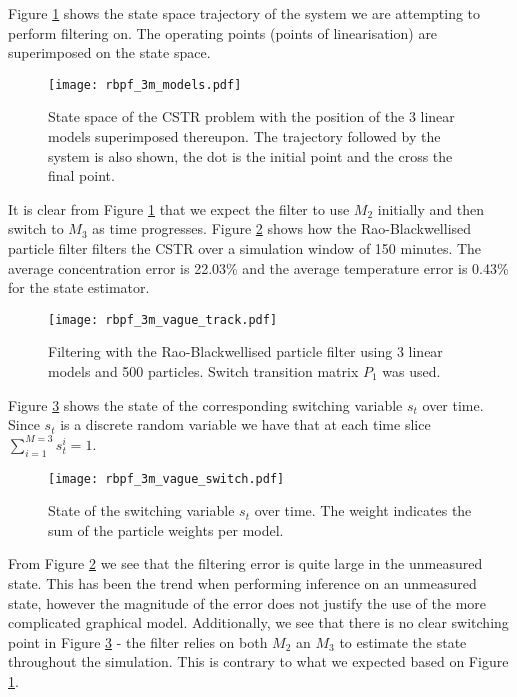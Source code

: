 Figure \ref{fig_3m_models} shows the state space trajectory of the system we are attempting to perform filtering on. The operating points (points of linearisation) are superimposed on the state space.
\begin{figure}[H] 
\centering
\texttt{[image: rbpf\_3m\_models.pdf]}
\caption{State space of the CSTR problem with the position of the 3 linear models superimposed thereupon. The trajectory followed by the system is also shown, the dot is the initial point and the cross the final point.}
\label{fig_3m_models}
\end{figure}
It is clear from Figure \ref{fig_3m_models} that we expect the filter to use $M_2$ initially and then switch to $M_3$ as time progresses. Figure \ref{fig_3m_vage_track} shows how the Rao-Blackwellised particle filter filters the CSTR over a simulation window of 150 minutes. The average concentration error is 22.03\% and the average temperature error is 0.43\% for the state estimator.
\begin{figure}[H] 
\centering
\texttt{[image: rbpf\_3m\_vague\_track.pdf]}
\caption{Filtering with the Rao-Blackwellised particle filter using 3 linear models and 500 particles. Switch transition matrix $P_1$ was used.}
\label{fig_3m_vage_track}
\end{figure}
Figure \ref{fig_3m_vage_switch} shows the state of the corresponding switching variable $s_t$ over time. Since $s_t$ is a discrete random variable we have that at each time slice $\sum_{i=1}^{M=3} s_t^i = 1$.
\begin{figure}[H] 
\centering
\texttt{[image: rbpf\_3m\_vague\_switch.pdf]}
\caption{State of the switching variable $s_t$ over time. The weight indicates the sum of the particle weights per model.}
\label{fig_3m_vage_switch}
\end{figure}
From Figure \ref{fig_3m_vage_track} we see that the filtering error is quite large in the unmeasured state. This has been the trend when performing inference on an unmeasured state, however the magnitude of the error does not justify the use of the more complicated graphical model. Additionally, we see that there is no clear switching point in Figure \ref{fig_3m_vage_switch} - the filter relies on both $M_2$ an $M_3$ to estimate the state throughout the simulation. This is contrary to what we expected based on Figure \ref{fig_3m_models}.

